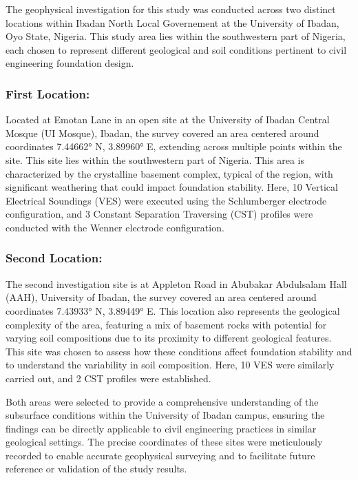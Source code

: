 \documentclass[12pt,a4paper]{report}
\begin{document}
The geophysical investigation for this study was conducted across two distinct locations within Ibadan North Local Governement at the University of Ibadan, Oyo State, Nigeria. This study area lies within the southwestern part of Nigeria, each chosen to represent different geological and soil conditions pertinent to civil engineering foundation design.

\subsubsection{\textbf{First Location:}}
Located at Emotan Lane in an open site at the University of Ibadan Central Mosque (UI Mosque), Ibadan, the survey covered an area centered around coordinates 7.44662° N, 3.89960° E, extending across multiple points within the site. This site lies within the southwestern part of Nigeria. This area is characterized by the crystalline basement complex, typical of the region, with significant weathering that could impact foundation stability. Here, 10 Vertical Electrical Soundings (VES) were executed using the Schlumberger electrode configuration, and 3 Constant Separation Traversing (CST) profiles were conducted with the Wenner electrode configuration.

\subsubsection{\textbf{Second Location:}}
The second investigation site is at Appleton Road in Abubakar Abdulsalam Hall (AAH), University of Ibadan, the survey covered an area centered around coordinates 7.43933° N, 3.89449° E. This location also represents the geological complexity of the area, featuring a mix of basement rocks with potential for varying soil compositions due to its proximity to different geological features. This site was chosen to assess how these conditions affect foundation stability and to understand the variability in soil composition. Here, 10 VES were similarly carried out, and 2 CST profiles were established.

Both areas were selected to provide a comprehensive understanding of the subsurface conditions within the University of Ibadan campus, ensuring the findings can be directly applicable to civil engineering practices in similar geological settings. The precise coordinates of these sites were meticulously recorded to enable accurate geophysical surveying and to facilitate future reference or validation of the study results.
\end{document}
